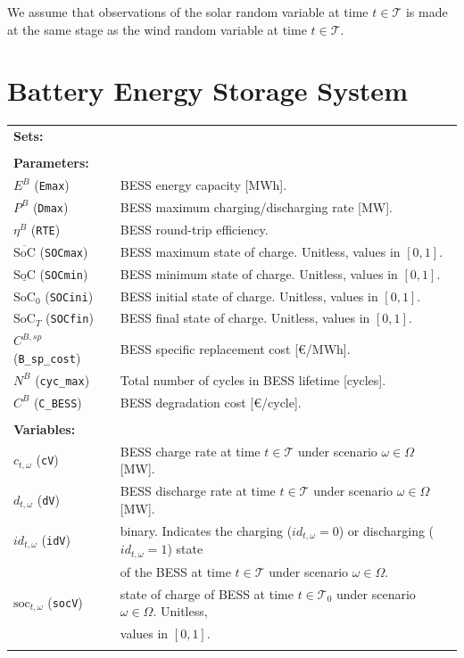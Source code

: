 \documentclass{article}
\newcommand{\SOC}{\text{SoC}}
\newcommand{\soc}{\text{soc}}
\begin{document}
We assume that observations of the solar random variable at time $t \in \mathcal{T}$ is made at the same stage as the wind random variable at time $t \in \mathcal{T}$.

\section{Battery Energy Storage System}
\label{SEC:BatteryEnergyStorageSystem}

\begin{tabularx}{\textwidth}{l l}
    \textbf{Sets:} \\
 	
    \\
    
    \textbf{Parameters:} \\
	$E^B$ (\verb|Emax|) & BESS energy capacity [MWh].	 \\
	$P^B$ (\verb|Dmax|) & BESS maximum charging/discharging rate [MW]. \\
	$\eta^B$ (\verb|RTE|) & BESS round-trip efficiency. \\
	$\overline{\SOC}$ (\verb|SOCmax|) & BESS maximum state of charge. Unitless, values in $[0, 1]$. \\
	$\underline{\SOC}$ (\verb|SOCmin|) & BESS minimum state of charge. Unitless, values in $[0, 1]$. \\
	$\SOC_0$ (\verb|SOCini|) & BESS initial state of charge. Unitless, values in $[0, 1]$. \\
	$\SOC_T$ (\verb|SOCfin|) & BESS final state of charge. Unitless, values in $[0, 1]$. \\
    $C^{B,sp}$ (\verb|B_sp_cost|) & BESS specific replacement cost [\euro/MWh]. \\
    $N^{B}$ (\verb|cyc_max|) & Total number of cycles in BESS lifetime [cycles]. \\
    $C^{B}$ (\verb|C_BESS|) & BESS degradation cost [\euro/cycle]. \\
	\\
       
    \textbf{Variables:} \\
	$c_{t, \omega}$ (\verb|cV|)& BESS charge rate at time $t \in \mathcal{T}$ under scenario $\omega \in \Omega$ [MW]. \\
	$d_{t, \omega}$ (\verb|dV|)& BESS discharge rate at time $t \in \mathcal{T}$ under scenario $\omega \in \Omega$ [MW]. \\	
	$id_{t, \omega}$ (\verb|idV|) & binary. Indicates the charging ($id_{t, \omega} = 0$) or discharging ($id_{t, \omega}= 1$) state \\
	& of the BESS at time $t \in \mathcal{T}$ under scenario $\omega \in \Omega$. \\
	$\soc_{t, \omega}$ (\verb|socV|) & state of charge of BESS at time $t \in \mathcal{T}_0$ under scenario $\omega \in \Omega$. Unitless, \\
	& values in $[0, 1]$. \\
	\\
\end{tabularx}
\end{document}
